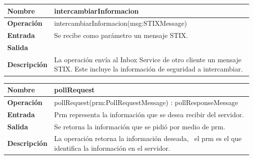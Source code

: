 \documentclass[11pt]{article}
\begin{document}
\bigskip


\bigskip
\newpage
\begin{flushleft}
\tablefirsthead{}
\tablehead{}
\tabletail{}
\tablelasttail{}
\begin{supertabular}{|m{1.0115598in}|m{4.7441597in}|}
\hline
{\bfseries Nombre} &
{\bfseries intercambiarInformacion}\\\hline
{\bfseries Operación} &
{ intercambiarInformacion(msg:STIXMessage)}\\\hline
{\bfseries Entrada} &
{ Se recibe como parámetro un mensaje STIX.}\\\hline
{\bfseries Salida} &
~
\\\hline
{\bfseries Descripción} &
{ La operación envía al Inbox Service de otro cliente un mensaje STIX. Este incluye la
información de seguridad a intercambiar.}\\\hline
\end{supertabular}
\end{flushleft}

\bigskip

\begin{flushleft}
\tablefirsthead{}
\tablehead{}
\tabletail{}
\tablelasttail{}
\begin{supertabular}{|m{1.0115598in}|m{4.7441597in}|}
\hline
{\bfseries Nombre} &
{\bfseries pollRequest}\\\hline
{\bfseries Operación} &
{ pollRequest(prm:PollRequestMessage) : pollResponseMessage}\\\hline
{\bfseries Entrada} &
{ Prm representa la información que se desea recibir del servidor.}\\\hline
{\bfseries Salida} &
{ Se retorna la información que se pidió por medio de prm.}\\\hline
{\bfseries Descripción} &
{ La operación retorna la información deseada, \ el prm es el que identifica la información en
el servidor.}\\\hline
\end{supertabular}
\end{flushleft}

\bigskip


\bigskip
\end{document}
